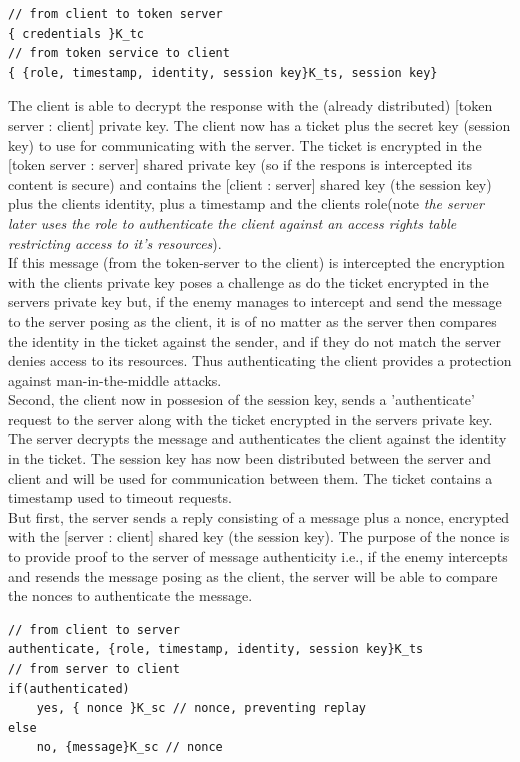 \begin{lstlisting}
// from client to token server
{ credentials }K_tc
// from token service to client
{ {role, timestamp, identity, session key}K_ts, session key} 
\end{lstlisting}

The client is able to decrypt the response with the (already distributed) [token server : client] private key. The client now has a ticket plus the secret key (session key) to use for communicating with the server. The ticket is encrypted in the [token server : server] shared private key (so if the respons is intercepted its content is secure) and contains the [client : server] shared key (the session key) plus the clients identity, plus a timestamp and the clients role(note \textit{the server later uses the role to authenticate the client against an access rights table restricting access to it's resources}). \\ 

If this message (from the token-server to the client) is intercepted the encryption with the clients private key poses a challenge as do the ticket encrypted in the servers private key but, if the enemy manages to intercept and send the message to the server posing as the client, it is of no matter as the server then compares the identity in the ticket against the sender, and if they do not match the server denies access to its resources. Thus authenticating the client provides a protection against man-in-the-middle attacks.\\

Second, the client now in possesion of the session key, sends a 'authenticate' request to the server along with the ticket encrypted in the servers private key. The server decrypts the message and authenticates the client against the identity in the ticket. The session key has now been distributed between the server and client and will be used for communication between them. The ticket contains a timestamp used to timeout requests. \\ 

But first, the server sends a reply consisting of a message plus a nonce, encrypted with the [server : client] shared key (the session key). The purpose of the nonce is to provide proof to the server of message authenticity i.e., if the enemy intercepts and resends the message posing as the client, the server will be able to compare the nonces to authenticate the message.  

\begin{lstlisting}
// from client to server
authenticate, {role, timestamp, identity, session key}K_ts 
// from server to client
if(authenticated)
	yes, { nonce }K_sc // nonce, preventing replay
else
	no, {message}K_sc // nonce
\end{lstlisting}

